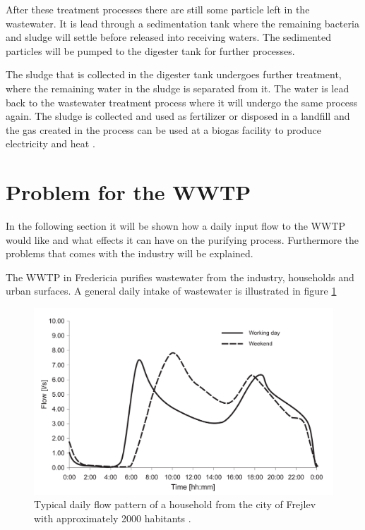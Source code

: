 After these treatment processes there are still some particle left in the wastewater. It is lead through a sedimentation tank where the remaining bacteria and sludge will settle before released into receiving waters. The sedimented particles will be pumped to the digester tank for further processes.


The sludge that is collected in the digester tank undergoes further treatment, where the remaining water in the sludge is separated from it. The water is lead back to the wastewater treatment process where it will undergo the same process again. The sludge is collected and used as fertilizer or disposed in a landfill and the gas created in the process can be used at a biogas facility to produce electricity and heat \cite{wwtp_ekstra}.


\section{Problem for the WWTP}
In the following section it will be shown how a daily input flow to the WWTP would like and what effects it can have on the purifying process. Furthermore the problems that comes with the industry will be explained. 

The WWTP in Fredericia purifies wastewater from the industry, households and urban surfaces. A general daily intake of wastewater is illustrated in figure \ref{fig:input_to_wwtp}  

\begin{figure}[H]
\centering
\includegraphics[width=.6\textwidth]{report/introduction/pictures/poopflow.png}
\caption{Typical daily flow pattern of a household from the city of Frejlev with approximately 2000 habitants \cite{schlutter1999numerical}.}
\label{fig:input_to_wwtp}%
\end{figure} 

